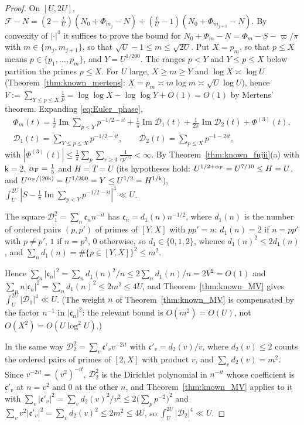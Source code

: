 \documentclass[11pt,a4paper]{article}
\makeatletter
\numberwithin{equation}{section}
\DeclareRobustCommand{\CGref}[1]{\ref{#1}}
\DeclareRobustCommand{\CGeqref}[1]{\eqref{#1}}
\let\CG@origref\ref
\let\CG@origeqref\eqref
\newcommand{\CG@gettip}[1]{\@ifundefined{CGTip@#1}{#1}{\csname CGTip@#1\endcsname}}
\DeclareRobustCommand{\CGref}[1]{\pdftooltip{\CG@origref{#1}}{\CG@gettip{#1}}}
\DeclareRobustCommand{\CGeqref}[1]{\pdftooltip{\CG@origeqref{#1}}{\CG@gettip{#1}}}
\theoremstyle{definition}
\theoremstyle{remark}
\newcommand{\Nz}{N_0} %
\newcommand{\Fc}{\mathcal F}
\newcommand{\Ph}{\Phi}
\makeatother
\begin{document}
\begin{proof}
On $[U,2U]$, $\Fc-N=(2-\frac tU)(\Nz+\Ph_{m_j}-N)+(\frac tU-1)(\Nz+\Ph_{m_{j+1}}-N)$. By convexity of $|\cdot|^4$ it suffices to prove the bound for $\Nz+\Ph_m-N=\Ph_m-S-\varpi/\pi$ with $m\in\{m_j,m_{j+1}\}$, so that $\sqrt U-1\le m\le\sqrt{2U}$. Put $X=p_m$, so that $p\le X$ means $p\in\{p_1,\dots,p_m\}$, and $Y=U^{1/200}$. The ranges $p<Y$ and $Y\le p\le X$ below partition the primes $p\le X$. For $U$ large, $X\ge m\ge Y$ and $\log X\asymp\log U$ (Theorem~\CGref{thm:known_mertens}: $X=p_m\asymp m\log m\asymp\sqrt U\log U$), hence $V:=\sum_{Y\le p\le X}\frac1p=\log\log X-\log\log Y+O(1)=O(1)$ by Mertens' theorem. Expanding \CGeqref{eq:Euler_phase},
\begin{equation}
\begin{gathered}
\Ph_m(t)=\frac1\pi\operatorname{Im}\sum_{p<Y}p^{-1/2-it}+\frac1\pi\operatorname{Im}\mathscr D_1(t)+\frac1{2\pi}\operatorname{Im}\mathscr D_2(t)+\Ph^{(3)}(t),\\
\mathscr D_1(t)=\sum_{Y\le p\le X}p^{-1/2-it},\qquad \mathscr D_2(t)=\sum_{p\le X}p^{-1-2it},
\end{gathered}
\label{eq:phase_split}
\end{equation}
with $|\Ph^{(3)}(t)|\le\frac1\pi\sum_p\sum_{r\ge3}\frac1{rp^{r/2}}<\infty$. By Theorem~\CGref{thm:known_fujii}(a) with $\mathsf k=2$, $\alpha_{\rm F}=\frac15$ and $H=T=U$ (its hypotheses hold: $U^{1/2+\alpha_{\rm F}}=U^{7/10}\le H=U$, and $U^{\alpha_{\rm F}/(20\mathsf k)}=U^{1/200}=Y\le U^{1/2}=H^{1/\mathsf k}$), $\int_U^{2U}|S-\frac1\pi\operatorname{Im}\sum_{p<Y}p^{-1/2-it}|^4\ll U$.

The square $\mathscr D_1^2=\sum_n\mathfrak c_nn^{-it}$ has $\mathfrak c_n=d_1(n)n^{-1/2}$, where $d_1(n)$ is the number of ordered pairs $(p,p')$ of primes of $[Y,X]$ with $pp'=n$: $d_1(n)=2$ if $n=pp'$ with $p\ne p'$, $1$ if $n=p^2$, $0$ otherwise, so $d_1\in\{0,1,2\}$, whence $d_1(n)^2\le2d_1(n)$, and $\sum_nd_1(n)=\#\{p\in[Y,X]\}^2\le m^2$.

Hence $\sum_n|\mathfrak c_n|^2=\sum_nd_1(n)^2/n\le2\sum_nd_1(n)/n=2V^2=O(1)$ and $\sum_nn|\mathfrak c_n|^2=\sum_nd_1(n)^2\le2m^2\le4U$, and Theorem~\CGref{thm:known_MV} gives $\int_U^{2U}|\mathscr D_1|^4\ll U$. (The weight $n$ of Theorem~\CGref{thm:known_MV} is compensated by the factor $n^{-1}$ in $|\mathfrak c_n|^2$: the relevant bound is $O(m^2)=O(U)$, not $O(X^2)=O(U\log^2U)$.)

In the same way $\mathscr D_2^2=\sum_v\mathfrak c'_vv^{-2it}$ with $\mathfrak c'_v=d_2(v)/v$, where $d_2(v)\le2$ counts the ordered pairs of primes of $[2,X]$ with product $v$, and $\sum_vd_2(v)=m^2$. Since $v^{-2it}=(v^2)^{-it}$, $\mathscr D_2^2$ is the Dirichlet polynomial in $n^{-it}$ whose coefficient is $\mathfrak c'_v$ at $n=v^2$ and $0$ at the other $n$, and Theorem~\CGref{thm:known_MV} applies to it with $\sum_v|\mathfrak c'_v|^2=\sum_vd_2(v)^2/v^2\le2\bigl(\sum_pp^{-2}\bigr)^2$ and $\sum_vv^2|\mathfrak c'_v|^2=\sum_vd_2(v)^2\le2m^2\le4U$, so $\int_U^{2U}|\mathscr D_2|^4\ll U$.


\end{proof}
\end{document}
